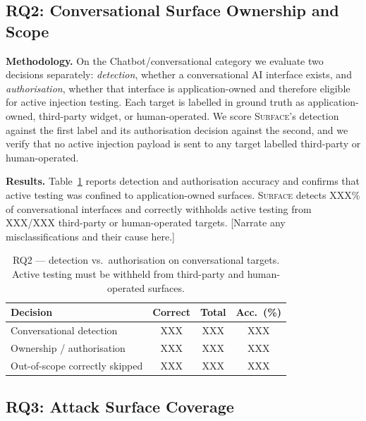 \subsection{RQ2: Conversational Surface Ownership and Scope}
\label{sec:eval:rq2}

\textbf{Methodology.} On the Chatbot/conversational category we evaluate two
decisions separately: \emph{detection}, whether a conversational AI interface
exists, and \emph{authorisation}, whether that interface is application-owned
and therefore eligible for active injection testing. Each target is labelled in
ground truth as application-owned, third-party widget, or human-operated. We
score \textsc{Surface}'s detection against the first label and its
authorisation decision against the second, and we verify that no active
injection payload is sent to any target labelled third-party or human-operated.

\textbf{Results.} Table~\ref{tab:rq2} reports detection and authorisation
accuracy and confirms that active testing was confined to application-owned
surfaces. \textsc{Surface} detects \textsc{XXX}\% of conversational interfaces
and correctly withholds active testing from \textsc{XXX}/\textsc{XXX}
third-party or human-operated targets. [Narrate any misclassifications and
their cause here.]

\begin{table}[t]
\centering
\caption{RQ2 --- detection vs.\ authorisation on conversational targets.
Active testing must be withheld from third-party and human-operated surfaces.}
\label{tab:rq2}
\small
\begin{tabular}{@{}lccc@{}}
\toprule
\textbf{Decision} & \textbf{Correct} & \textbf{Total} & \textbf{Acc.\ (\%)} \\
\midrule
Conversational detection      & \textsc{XXX} & \textsc{XXX} & \textsc{XXX} \\
Ownership / authorisation     & \textsc{XXX} & \textsc{XXX} & \textsc{XXX} \\
Out-of-scope correctly skipped& \textsc{XXX} & \textsc{XXX} & \textsc{XXX} \\
\bottomrule
\end{tabular}
\end{table}

\subsection{RQ3: Attack Surface Coverage}
\label{sec:eval:rq3}

